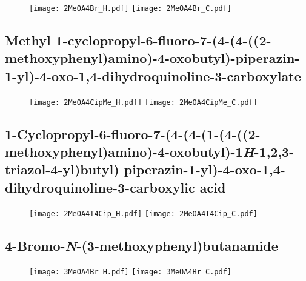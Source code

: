 \begin{figure}[H]
	\centering
		\texttt{[image: 2MeOA4Br\_H.pdf]}
		\texttt{[image: 2MeOA4Br\_C.pdf]}
\end{figure}

\subsection{Methyl 1\hyp{}cyclopropyl\hyp{}6\hyp{}fluoro\hyp{}7\hyp{}(4\hyp{}(4\hyp{}((2\hyp{}methoxyphenyl)amino)\hyp{}4\hyp{}oxobutyl)\hyp{}piperazin\hyp{}1\hyp{}yl)\hyp{}4\hyp{}oxo\hyp{}1,4\hyp{}dihydroquinoline\hyp{}3\hyp{}carboxylate }

\begin{figure}[H]
	\centering
		\texttt{[image: 2MeOA4CipMe\_H.pdf]}
		\texttt{[image: 2MeOA4CipMe\_C.pdf]}
\end{figure}

\subsection{1\hyp{}Cyclopropyl\hyp{}6\hyp{}fluoro\hyp{}7\hyp{}(4\hyp{}(4\hyp{}(1\hyp{}(4\hyp{}((2\hyp{}methoxyphenyl)amino)\hyp{}4\hyp{}oxobutyl)\hyp{}1\textit{H}\hyp{}1,2,3\hyp{}triazol\hyp{}4\hyp{}yl)\allowbreak butyl) piperazin\hyp{}1\hyp{}yl)\hyp{}4\hyp{}oxo\hyp{}1,4\hyp{}dihydroquinoline\hyp{}3\hyp{}carboxylic acid }

\begin{figure}[H]
	\centering
		\texttt{[image: 2MeOA4T4Cip\_H.pdf]}
		\texttt{[image: 2MeOA4T4Cip\_C.pdf]}
\end{figure}

\subsection{4\hyp{}Bromo\hyp{}\textit{N}\hyp{}(3\hyp{}methoxyphenyl)butanamide }

\begin{figure}[H]
	\centering
		\texttt{[image: 3MeOA4Br\_H.pdf]}
		\texttt{[image: 3MeOA4Br\_C.pdf]}
\end{figure}

